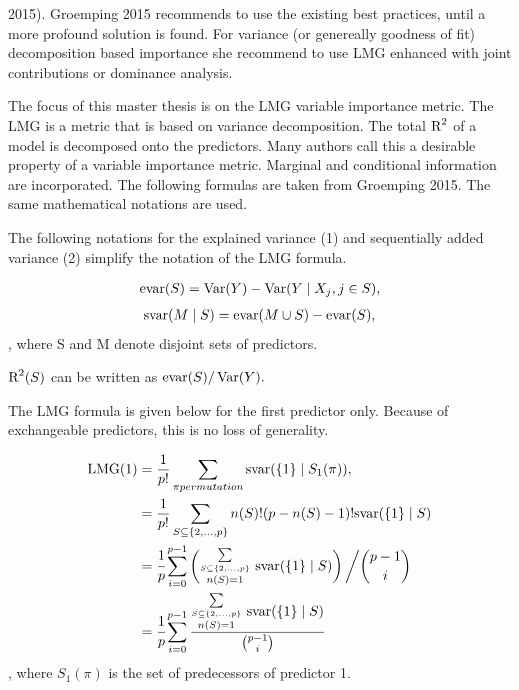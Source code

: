 \documentclass[11pt,a4paper,twoside]{book}
\begin{document}
2015). Groemping 2015 recommends to use the existing best practices, until a more profound solution is found. For variance (or genereally goodness of fit) decomposition based importance she recommend to use LMG enhanced with joint contributions or dominance analysis.  

The focus of this master thesis is on the LMG variable importance metric. The LMG is a metric that is based on variance decomposition. The total $\text{R}^2$ of a model is decomposed onto the predictors. Many authors call this a desirable property of a variable importance metric. Marginal and conditional information are incorporated.  The following formulas are taken from Groemping 2015. The same mathematical notations are used. 

The following  notations for the explained variance (1) and sequentially added variance (2) simplify the notation of the LMG formula. 

   \begin{align} 
     \text{evar}(S) = \operatorname{Var}(Y) - \operatorname{Var}( Y \mid X_{j}, j \in S),   \label{eq:1} 
   \end{align} 
   \begin{align} 
     \text{svar}(M \mid S) = \text{evar}(M \cup S) - \text{evar}(S), \label{eq:2} 
    \end{align} , where S and M denote disjoint sets of predictors.
    
 $\text{R}^2(S)$ can be written as $\text{evar}(S)/\operatorname{Var}(Y).$   
   
  The LMG formula is given below for the first predictor only. Because of exchangeable predictors, this is no loss of generality.

   \begin{align} 
     \LMG(1) &= \frac{1}{p!} \sum_{\pi permutation}^{} \SVAR(\{1\} \mid S_{1}(\pi)),   \nonumber  \\
     &= \frac{1}{p!} \sum_{S \subseteq \{ 2, \dots, p \} }^{} n(S)!(p-n(S)-1)! \SVAR(\{1\} \mid S) \nonumber  \\
     &=  \cfrac{1}{p} \sum_{i=0}^{p-1} \left( \substack {\sum\limits_{ S \subseteq \{ 2, \dots, p \}}\\n(S)=1}^{} \ \SVAR(\{1\} \mid S)\right)\bigg/ \binom{p-1}{i}\\   
         &=  \cfrac{1}{p} \sum_{i=0}^{p-1} \frac{ \substack{\sum\limits_{ S \subseteq \{ 2, \dots, p \}}\\n(S)=1}^{} \ \SVAR(\{1\} \mid S)}{\binom{p-1}{i}} \\      
   \end{align},
   where $S_{1}(\pi)$ is the set of predecessors of predictor 1.
   
\end{document}
